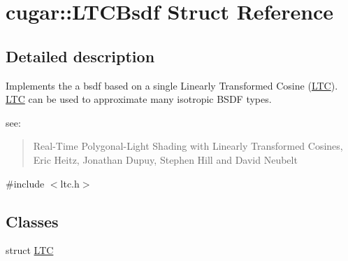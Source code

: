 \hypertarget{structcugar_1_1_l_t_c_bsdf}{}\section{cugar\+:\+:L\+T\+C\+Bsdf Struct Reference}
\label{structcugar_1_1_l_t_c_bsdf}


\subsection{Detailed description}
Implements the a bsdf based on a single Linearly Transformed Cosine (\hyperlink{structcugar_1_1_l_t_c_bsdf_1_1_l_t_c}{L\+TC}). \hyperlink{structcugar_1_1_l_t_c_bsdf_1_1_l_t_c}{L\+TC} can be used to approximate many isotropic B\+S\+DF types.

see\+: \begin{quote}
Real-\/\+Time Polygonal-\/\+Light Shading with Linearly Transformed Cosines, Eric Heitz, Jonathan Dupuy, Stephen Hill and David Neubelt\end{quote}


{\ttfamily \#include $<$ltc.\+h$>$}

\subsection*{Classes}
\begin{DoxyCompactItemize}
\item 
struct \hyperlink{structcugar_1_1_l_t_c_bsdf_1_1_l_t_c}{L\+TC}
\end{DoxyCompactItemize}
